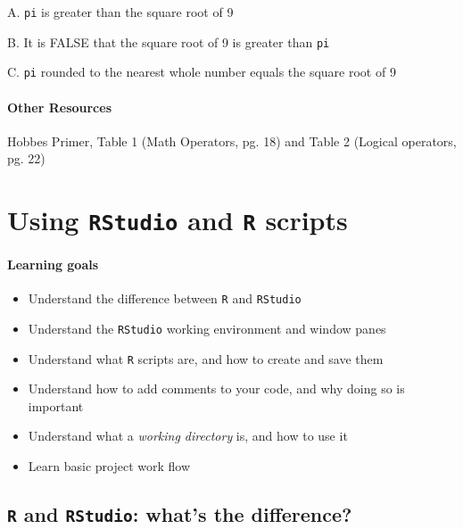 \documentclass[
]{book}
\providecommand{\tightlist}{%
  \setlength{\itemsep}{0pt}\setlength{\parskip}{0pt}}
\begin{document}
A. \texttt{pi} is greater than the square root of 9

B. It is FALSE that the square root of 9 is greater than \texttt{pi}

C. \texttt{pi} rounded to the nearest whole number equals the square root of 9

\hypertarget{other-resources}{%
\subsubsection*{Other Resources}\label{other-resources}}

Hobbes Primer, Table 1 (Math Operators, pg. 18) and Table 2 (Logical operators, pg. 22)

\hypertarget{using-rstudio-and-r-scripts}{%
\chapter{\texorpdfstring{Using \texttt{RStudio} and \texttt{R} scripts}{Using RStudio and R scripts}}\label{using-rstudio-and-r-scripts}}

\hypertarget{learning-goals-1}{%
\subsubsection*{Learning goals}\label{learning-goals-1}}

\begin{itemize}
\tightlist
\item
  Understand the difference between \texttt{R} and \texttt{RStudio}
\item
  Understand the \texttt{RStudio} working environment and window panes\\
\item
  Understand what \texttt{R} scripts are, and how to create and save them
\item
  Understand how to add comments to your code, and why doing so is important
\item
  Understand what a \emph{working directory} is, and how to use it
\item
  Learn basic project work flow
\end{itemize}

\hypertarget{r-and-rstudio-whats-the-difference}{%
\section*{\texorpdfstring{\texttt{R} and \texttt{RStudio}: what's the difference?}{R and RStudio: what's the difference?}}\label{r-and-rstudio-whats-the-difference}}
\end{document}
